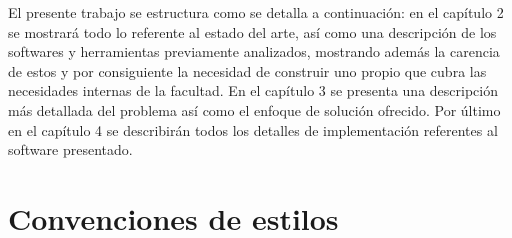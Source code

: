 \begin{introduction}
	El presente trabajo se estructura como se detalla a continuación: en el capítulo 2 se mostrará todo lo referente al estado del arte, así como una descripción de los softwares y herramientas previamente analizados, mostrando además la carencia de estos y por consiguiente la necesidad de construir uno propio que cubra las necesidades internas de la facultad. En el capítulo 3 se presenta una descripción más detallada del problema así como el enfoque de solución ofrecido. Por último en el capítulo 4 se describirán todos los detalles de implementación referentes al software presentado.
	
	\section{Convenciones de estilos}

\end{introduction}
